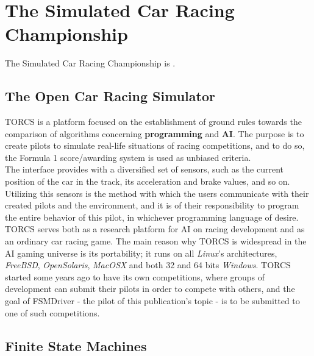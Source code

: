 \section{The Simulated Car Racing Championship}

The Simulated Car Racing Championship is . 

\subsection{The Open Car Racing Simulator}

TORCS is a platform focused on the establishment of ground rules towards the comparison of algorithms concerning \textbf{programming} and \textbf{AI}. The purpose is to create pilots to simulate real-life situations of racing competitions, and to do so, the Formula 1 score/awarding system is used as unbiased criteria.\\
The interface provides with a diversified set of sensors, such as the current position of the car in the track, its acceleration and brake values, and so on. Utilizing this sensors is the method with which the users communicate with their created pilots and the environment, and it is of their responsibility to program the entire behavior of this pilot, in whichever programming language of desire.\\
TORCS serves both as a research platform for AI on racing development and as an ordinary car racing game. The main reason why TORCS is widespread in the AI gaming universe is its portability; it runs on all \textit{Linux}'s architectures, \textit{FreeBSD}, \textit{OpenSolaris}, \textit{MacOSX} and both 32 and 64 bits \textit{Windows}. TORCS started some years ago to have its own competitions, where groups of development can submit their pilots in order to compete with others, and the goal of FSMDriver - the pilot of this publication's topic - is to be submitted to one of such competitions.

\subsection{Finite State Machines}
